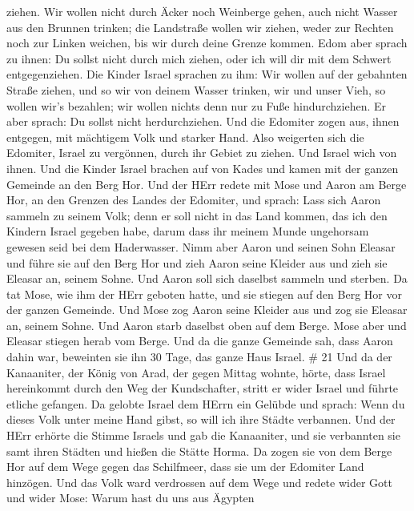 ziehen. Wir wollen nicht durch Äcker noch Weinberge gehen, auch nicht
Wasser aus den Brunnen trinken; die Landstraße wollen wir ziehen, weder
zur Rechten noch zur Linken weichen, bis wir durch deine Grenze kommen.
 Edom aber sprach zu ihnen: Du sollst nicht durch mich
ziehen, oder ich will dir mit dem Schwert entgegenziehen. 
Die Kinder Israel sprachen zu ihm: Wir wollen auf der gebahnten Straße
ziehen, und so wir von deinem Wasser trinken, wir und unser Vieh, so
wollen wir's bezahlen; wir wollen nichts denn nur zu Fuße
hindurchziehen.  Er aber sprach: Du sollst nicht
herdurchziehen. Und die Edomiter zogen aus, ihnen entgegen, mit
mächtigem Volk und starker Hand.  Also weigerten sich die
Edomiter, Israel zu vergönnen, durch ihr Gebiet zu ziehen. Und Israel
wich von ihnen.  Und die Kinder Israel brachen auf von
Kades und kamen mit der ganzen Gemeinde an den Berg Hor. 
Und der HErr redete mit Mose und Aaron am Berge Hor, an den Grenzen des
Landes der Edomiter, und sprach:  Lass sich Aaron sammeln
zu seinem Volk; denn er soll nicht in das Land kommen, das ich den
Kindern Israel gegeben habe, darum dass ihr meinem Munde ungehorsam
gewesen seid bei dem Haderwasser.  Nimm aber Aaron und
seinen Sohn Eleasar und führe sie auf den Berg Hor  und
zieh Aaron seine Kleider aus und zieh sie Eleasar an, seinem Sohne. Und
Aaron soll sich daselbst sammeln und sterben.  Da tat Mose,
wie ihm der HErr geboten hatte, und sie stiegen auf den Berg Hor vor der
ganzen Gemeinde.  Und Mose zog Aaron seine Kleider aus und
zog sie Eleasar an, seinem Sohne. Und Aaron starb daselbst oben auf dem
Berge. Mose aber und Eleasar stiegen herab vom Berge.  Und
da die ganze Gemeinde sah, dass Aaron dahin war, beweinten sie ihn 30
Tage, das ganze Haus Israel. \# 21  Und da der Kanaaniter,
der König von Arad, der gegen Mittag wohnte, hörte, dass Israel
hereinkommt durch den Weg der Kundschafter, stritt er wider Israel und
führte etliche gefangen.  Da gelobte Israel dem HErrn ein
Gelübde und sprach: Wenn du dieses Volk unter meine Hand gibst, so will
ich ihre Städte verbannen.  Und der HErr erhörte die Stimme
Israels und gab die Kanaaniter, und sie verbannten sie samt ihren
Städten und hießen die Stätte Horma.  Da zogen sie von dem
Berge Hor auf dem Wege gegen das Schilfmeer, dass sie um der Edomiter
Land hinzögen. Und das Volk ward verdrossen auf dem Wege 
und redete wider Gott und wider Mose: Warum hast du uns aus Ägypten
